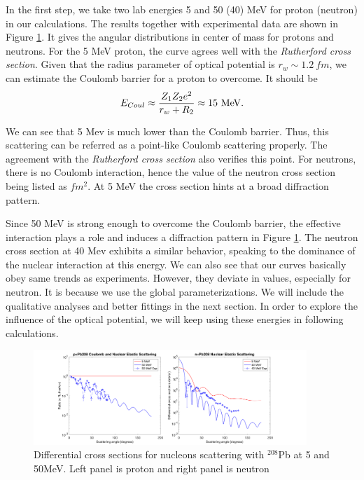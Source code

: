 	In the first step, we take two lab energies 5 and 50 (40) MeV for proton (neutron) in our calculations. The results together with experimental data are shown in Figure \ref{fig:angulardistribution}. It gives the angular distributions in center of mass for protons and neutrons. For the 5 MeV proton, the curve agrees well with the \emph{Rutherford cross section}. Given that the radius parameter of optical potential is $r_w\sim1.2\ fm$, we can estimate the Coulomb barrier for a proton to overcome. It should be 
	\begin{equation}
	E_{Coul}\approx\frac{Z_1Z_2e^2}{r_w+R_2}\approx15\ \rm{MeV}.
	\end{equation}
	
	We can see that 5 Mev is much lower than the Coulomb barrier. Thus, this scattering can be referred as a point-like Coulomb scattering properly. The agreement with the \emph{Rutherford cross section} also verifies this point.
	For neutrons, there is no Coulomb interaction, hence the value of the neutron cross section being listed as $fm^2$. At 5 MeV the cross section hints at a broad diffraction pattern.
	
	Since 50 MeV is strong enough to overcome the Coulomb barrier, the effective interaction plays a role and induces a diffraction pattern in Figure \ref{fig:angulardistribution}. 
	The neutron cross section at 40 Mev exhibits a similar behavior, speaking to the dominance of the nuclear interaction at this energy.
	 We can also see that our curves basically obey same trends as experiments. 
	 However, they deviate in values, especially for neutron. 
	 It is because we use the global parameterizations. 
	 We will include the qualitative analyses and better fittings in the next section.
	  In order to explore the influence of the optical potential, we will keep using these energies in following calculations.
	
	\begin{figure}[t]
	\centering
	\includegraphics[width=0.92\textwidth]{5.png}
	\caption{Differential cross sections for nucleons scattering with $^{208}$Pb at 5 and 50MeV. Left panel is proton and right panel is neutron  }
	\label{fig:angulardistribution}
	\end{figure}
	
